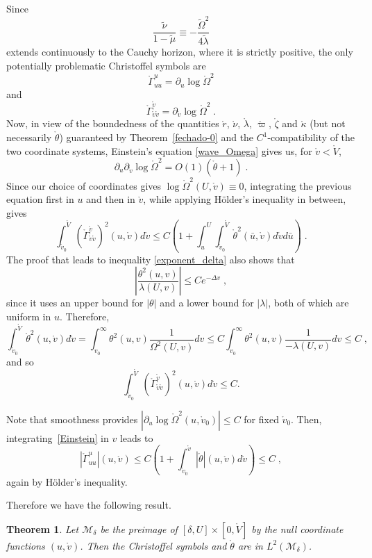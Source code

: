 \documentclass[a4paper,11pt,oneside,reqno]{amsart}
\newtheorem{Thm}{Theorem}[section]
\newcommand{\cal}{\mathcal}
\newcommand{\mrpp}{\mathring}
\newcommand{\mv}{\mathring{v}}
\begin{document}
Since
$$ \frac{\tilde \nu}{1-\tilde \mu}\equiv -\frac{{\tilde\Omega}^2}{4\tilde\lambda}$$
extends continuously to the Cauchy horizon, where it is strictly positive, the only potentially problematic Christoffel symbols are 
$$\mrpp \Gamma^u_{uu}=\partial_u \log \mrpp \Omega^2$$
and
$$\mrpp \Gamma^{\mv}_{\mv\mv}=\partial_{\mv} \log \mrpp \Omega^2 \;.$$
Now, in view of the boundedness of the quantities $\mathring r$, $\mathring\nu$, $\mathring\lambda$, $\mathring\varpi$, $\mathring\zeta$ and $\mathring\kappa$ (but not necessarily $\mathring{\theta}$) guaranteed by Theorem~\ref{fechado-0} and the $C^1$-compatibility of the two coordinate systems, Einstein's equation \eqref{wave_Omega} gives us, for $\mv<\mrpp V$, 
\begin{equation}
\label{Einstein}
 \partial_u\partial_{\mv}  \log \mrpp \Omega^2 = O(1) (\mrpp \theta +1)\;.
\end{equation}
Since our choice of coordinates gives $ \log \mrpp \Omega^2 (U,\mv)\equiv 0$, integrating the previous equation first in $u$ and then in $\mv$, while applying H\"older's inequality in between, gives
$$\int_{\mrpp v_0}^{\mrpp V} \left(\mrpp \Gamma^{\mv}_{\mv\mv}\right)^2(u,\mv) d\mv \leq 
C \left(1+\int_u^U \int_{\mrpp v_0}^{\mrpp V}\mrpp \theta^2(\bar u,\mv) d\mv  d\bar u \right)\;.$$       
The proof that leads to inequality \eqref{exponent_delta} also shows that 
\begin{equation}
\label{est}
\left| \frac{ \theta^2(u,v)}{\lambda(U,v)}\right|\leq C e^{-\Delta v}\;,
\end{equation}
since it uses an upper bound for $|\theta|$ and a lower bound for $|\lambda|$, both of which are uniform in $u$. Therefore, 
$$\int_{\mrpp v_0}^{\mrpp V}\mrpp \theta^2(u,\mv) d\mv = \int_{v_0}^{\infty}\theta^2(u,v)\frac{1}{\Omega^2(U,v)} dv \leq C  \int_{v_0}^{\infty}\theta^2(u,v)\frac{1}{-\lambda(U,v)} dv\leq C\;,$$
and so
$$\int_{\mrpp v_0}^{\mrpp V} \left(\mrpp \Gamma^{\mv}_{\mv\mv}\right)^2(u,\mv) d\mv \leq C.$$
  
Note that smoothness provides $|\partial_u\log\mrpp \Omega^2(u,\mv_0)|\leq C$ for fixed $\mv_0$. Then, integrating~\eqref{Einstein} in $v$ leads to
$$\left|\mrpp \Gamma^u_{uu}\right|(u,\mv) \leq C\left(1+\int_{\mv_0}^{\mv} |\mrpp \theta|(u,\mv) d\mv \right)\leq C\;,$$
again by H\"older's inequality.

Therefore we have the following result.

\begin{Thm}\label{breakdown} 
Let ${\cal M}_\delta$ be the preimage of $[\delta,U]\times[0,\mathring{V}]$ by the null coordinate functions $(u,\mathring v)$. Then the Christoffel symbols and $\mrpp\theta$ are in $L^2({\cal M}_\delta)$.
\end{Thm}
\end{document}

